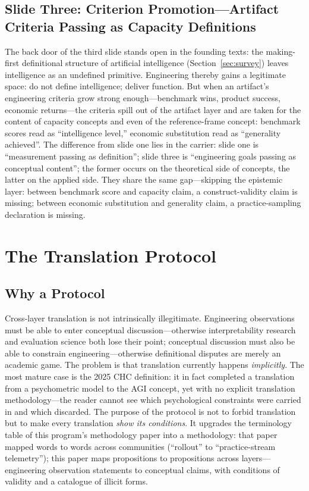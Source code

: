 \documentclass[10pt]{article}
\begin{document}
\subsection{Slide Three: Criterion Promotion---Artifact Criteria Passing as Capacity Definitions}

The back door of the third slide stands open in the founding texts: the making-first definitional structure of artificial intelligence (Section~\ref{sec:survey}) leaves intelligence as an undefined primitive. Engineering thereby gains a legitimate space: do not define intelligence; deliver function. But when an artifact's engineering criteria grow strong enough---benchmark wins, product success, economic returns---the criteria spill out of the artifact layer and are taken for the content of capacity concepts and even of the reference-frame concept: benchmark scores read as ``intelligence level,'' economic substitution read as ``generality achieved''\cite{openai2018charter}. The difference from slide one lies in the carrier: slide one is ``measurement passing as definition''; slide three is ``engineering goals passing as conceptual content''; the former occurs on the theoretical side of concepts, the latter on the applied side. They share the same gap---skipping the epistemic layer: between benchmark score and capacity claim, a construct-validity claim is missing\cite{raji2021benchmark,bean2025measuring}; between economic substitution and generality claim, a practice-sampling declaration is missing\cite{yu2026theory}.

\section{The Translation Protocol}\label{sec:protocol}

\subsection{Why a Protocol}

Cross-layer translation is not intrinsically illegitimate. Engineering observations must be able to enter conceptual discussion---otherwise interpretability research and evaluation science both lose their point; conceptual discussion must also be able to constrain engineering---otherwise definitional disputes are merely an academic game. The problem is that translation currently happens \emph{implicitly}. The most mature case is the 2025 CHC definition\cite{hendrycks2025definition}: it in fact completed a translation from a psychometric model to the AGI concept, yet with no explicit translation methodology---the reader cannot see which psychological constraints were carried in and which discarded. The purpose of the protocol is not to forbid translation but to make every translation \emph{show its conditions}. It upgrades the terminology table of this program's methodology paper into a methodology\cite{yu2026methodology}: that paper mapped words to words across communities (``rollout'' to ``practice-stream telemetry''); this paper maps propositions to propositions across layers---engineering observation statements to conceptual claims, with conditions of validity and a catalogue of illicit forms.
\end{document}
